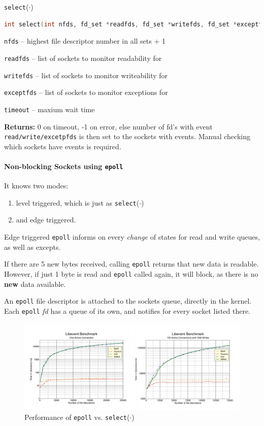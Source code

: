 \documentclass[english]{panikzettel}
\newcommand{\fkt}[1]{\texttt{#1}(\(\cdot\))}
\begin{document}
	\begin{defi}{\fkt{select}}
		\begin{lstlisting}[language=C]
			int select(int nfds, fd_set *readfds, fd_set *writefds, fd_set *exceptfds, struct timeval *timeout);
		\end{lstlisting}
		\tcblower
		\texttt{nfds} – highest file descriptor number in all sets + 1 
		
		\texttt{readfds} – list of sockets to monitor readability for 

		\texttt{writefds} – list of sockets to monitor writeability for

		\texttt{exceptfds} – list of sockets to monitor exceptions for
		
		\texttt{timeout} – maxium wait time
		
		\textbf{Returns:} 0 on timeout, -1 on error, else number of fd's with event \texttt{read/write/excetpfds} is then set to the sockets with events. Manual checking which sockets have events is required.
		\texttt{}
	\end{defi}

	\paragraph{Non-blocking Sockets using \texttt{epoll}}

	It knows two modes:
	\begin{enumerate}
		\item level triggered, which is just as \fkt{select}
		\item and edge triggered.
	\end{enumerate}

	Edge triggered \texttt{epoll} informs on every \textit{change} of states for read and write queues, as well as excepts. 

	If there are 5 new bytes received, calling \texttt{epoll} returns that new data is readable. 
	However, if just 1 byte is read and \texttt{epoll} called again, it will block, as there is no \textbf{new} data available.

	An \texttt{epoll} file descriptor is attached to the sockets queue, directly in the kernel.
	Each \texttt{epoll} \textit{fd} has a queue of its own, and notifies for every socket listed there.

	\begin{figure}[H]
		\centering
		\includegraphics[width=\textwidth]{img/1-epoll-vs-select.png}
		\caption{Performance of \texttt{epoll} vs. \fkt{select}}
		\label{img-1-epoll-vs-select}
	\end{figure}
\end{document}
